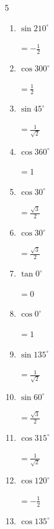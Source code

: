 \begin{multicols}{5}
\begin{enumerate}
        $\displaystyle =-\sqrt{3}$

  \item $\displaystyle \sin{210^\circ}$

        $\displaystyle =-\frac{1}{2}$

  \item $\displaystyle \cos{300^\circ}$

        $\displaystyle =\frac{1}{2}$

  \item $\displaystyle \sin{45^\circ}$

        $\displaystyle =\frac{1}{\sqrt{2}}$

  \item $\displaystyle \cos{360^\circ}$

        $\displaystyle =1$

  \item $\displaystyle \cos{30^\circ}$

        $\displaystyle =\frac{\sqrt{3}}{2}$

  \item $\displaystyle \cos{30^\circ}$

        $\displaystyle =\frac{\sqrt{3}}{2}$

  \item $\displaystyle \tan{0^\circ}$

        $\displaystyle =0$

  \item $\displaystyle \cos{0^\circ}$

        $\displaystyle =1$

  \item $\displaystyle \sin{135^\circ}$

        $\displaystyle =\frac{1}{\sqrt{2}}$

  \item $\displaystyle \sin{60^\circ}$

        $\displaystyle =\frac{\sqrt{3}}{2}$

  \item $\displaystyle \cos{315^\circ}$

        $\displaystyle =\frac{1}{\sqrt{2}}$

\columnbreak %

  \item $\displaystyle \cos{120^\circ}$

        $\displaystyle =-\frac{1}{2}$

  \item $\displaystyle \cos{135^\circ}$


\end{enumerate}
\end{multicols}

